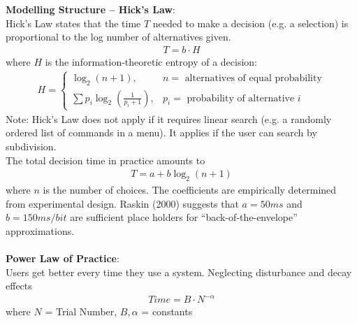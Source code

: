 \textbf{Modelling Structure -- Hick's Law}:\\
Hick's Law states that the time $T$ needed to make a decision (e.g. a selection) is proportional to the log number of alternatives given.
\begin{align*}
T = b \cdot H
\end{align*}
where $H$ is the information-theoretic entropy of a decision:
\begin{align*}
H = 
\begin{cases}
\log_2(n+1), & n = \text{ alternatives of equal probability}\\
\sum p_i \log_2(\frac{1}{p_i + 1}), & p_i = \text{ probability of alternative }i
\end{cases}
\end{align*}
Note: Hick's Law does not apply if it requires linear search (e.g. a randomly ordered list of commands in a menu). It applies if the user can search by subdivision.\\
The total decision time in practice amounts to 
\begin{align*}
T = a + b \log_2(n+1)
\end{align*}
where $n$ is the number of choices. The coefficients are empirically determined from experimental design. Raskin (2000) suggests that $a= 50 ms$ and $b=150 ms/bit$ are sufficient place holders for ``back-of-the-envelope'' approximations.\\\\
\textbf{Power Law of Practice}:\\
Users get better every time they use a system. Neglecting disturbance and decay effects
\begin{align*}
Time = B\cdot N^{-\alpha}
\end{align*}
where $N$ = Trial Number, $B, \alpha$ = constants

